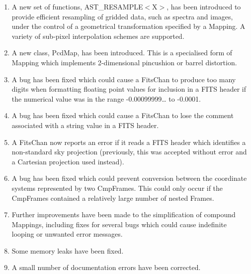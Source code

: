 \documentclass[twoside,11pt]{article}
\newcommand{\htmlref}[2]{#1}
\begin{document}
\begin{enumerate}
\item A new set of functions, \htmlref{AST\_RESAMPLE$<$X$>$}{AST_RESAMPLEX}, has been introduced to
provide	efficient resampling of gridded data, such as spectra and
images, under the control of a geometrical transformation specified by
a \htmlref{Mapping}{Mapping}. A variety of sub-pixel interpolation schemes are supported.

\item A new class, \htmlref{PcdMap}{PcdMap}, has been introduced. This is a specialised
form of Mapping which implements 2-dimensional pincushion or barrel
distortion.

\item A bug has been fixed which could cause a \htmlref{FitsChan}{FitsChan} to produce too
many digits when formatting floating point values for inclusion in a
FITS header if the numerical value was in the range -0.00099999\ldots
to -0.0001.

\item A bug has been fixed which could cause a FitsChan to lose the
comment associated with a string value in a FITS header.

\item A FitsChan now reports an error if it reads a FITS header which
identifies a non-standard sky projection (previously, this was
accepted without error and a Cartesian projection used instead).

\item A bug has been fixed which could prevent conversion between the
coordinate systems represented by two CmpFrames. This could only occur
if the CmpFrames contained a relatively large number of nested Frames.

%
\item Further improvements have been made to the simplification of
compound Mappings, including fixes for several bugs which could cause
indefinite looping or unwanted error messages.

\item Some memory leaks have been fixed.

\item A small number of documentation errors have been corrected.
\end{enumerate}
\end{document}
